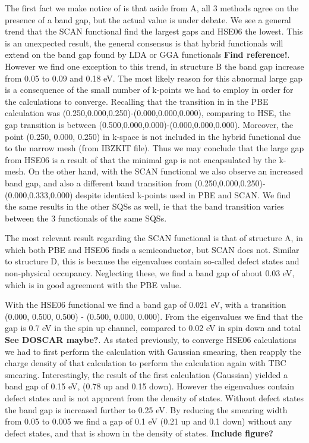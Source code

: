 The first fact we make notice of is that aside from A, all 3 methods agree on the presence of a band gap, but the actual value is under debate. We see a general trend that the SCAN functional find the largest gaps and HSE06 the lowest. This is an unexpected result, the general consensus is that hybrid functionals will extend on the band gap found by LDA or GGA functionals \textbf{Find reference!}. However we find one exception to this trend, in structure B the band gap increase from 0.05 to 0.09 and 0.18 eV. The most likely reason for this abnormal large gap is a consequence of the small number of k-points we had to employ in order for the calculations to converge. Recalling that the transition in in the PBE calculation was (0.250,0.000,0.250)-(0.000,0.000,0.000), comparing to HSE, the gap transition is between (0.500,0.000,0.000)-(0.000,0.000,0.000). Moreover, the point (0.250, 0.000, 0.250) in k-space is not included in the hybrid functional due to the narrow mesh (from IBZKIT file). Thus we may conclude that the large gap from HSE06 is a result of that the minimal gap is not encapsulated by the k-mesh. On the other hand, with the SCAN functional we also observe an increased band gap, and also a different band transition from (0.250,0.000,0.250)-(0.000,0.333,0.000) despite identical k-points used in PBE and SCAN. We find the same results in the other SQSs as well, ie that the band transition varies between the 3 functionals of the same SQSs. 

The most relevant result regarding the SCAN functional is that of structure A, in which both PBE and HSE06 finds a semiconductor, but SCAN does not. Similar to structure D, this is because the eigenvalues contain so-called defect states and non-physical occupancy. Neglecting these, we find a band gap of about 0.03 eV, which is in good agreement with the PBE value.     

With the HSE06 functional we find a band gap of 0.021 eV, with a transition (0.000, 0.500, 0.500) - (0.500, 0.000, 0.000). From the eigenvalues we find that the gap is 0.7 eV in the spin up channel, compared to 0.02 eV in spin down and total \textbf{See DOSCAR maybe?}. As stated previously, to converge HSE06 calculations we had to first perform the calculation with Gaussian smearing, then reapply the charge density of that calculation to perform the calculation again with TBC smearing. Interestingly, the result of the first calculation (Gaussian) yielded a band gap of 0.15 eV, (0.78 up and 0.15 down). However the eigenvalues contain defect states and is not apparent from the density of states. Without defect states the band gap is increased further to 0.25 eV. By reducing the smearing width from 0.05 to 0.005 we find a gap of 0.1 eV (0.21 up and 0.1 down) without any defect states, and that is shown in the density of states. \textbf{Include figure?} 

